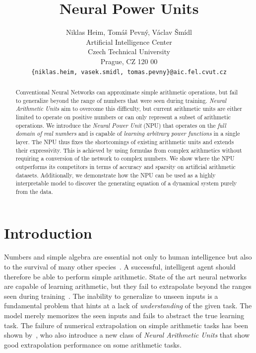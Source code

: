 \documentclass[9pt]{article}
\title{Neural Power Units}
\author{
  Niklas Heim,
  Tom\'a\v s Pevn\'y,
  V\'aclav \v Sm\'idl\\
  Artificial Intelligence Center\\
  Czech Technical University\\
  Prague, CZ 120 00\\
  \texttt{\{niklas.heim, vasek.smidl, tomas.pevny\}@aic.fel.cvut.cz}\\
}
\begin{document}
\maketitle

\begin{abstract}
  Conventional Neural Networks can approximate simple arithmetic operations, but fail
  to generalize beyond the range of numbers that were seen during training.
  \emph{Neural Arithmetic Units} aim to overcome this difficulty, but current
  arithmetic units are either limited to operate on positive numbers or can
  only represent a subset of arithmetic operations. We introduce the \emph{Neural
  Power Unit} (NPU) that operates on the
  \emph{full domain of real numbers} and is capable of \emph{learning
  arbitrary power functions} in a single layer.
  The NPU thus fixes the shortcomings of existing arithmetic units and extends
  their expressivity. This is achieved by using formulas from complex arithmetics
  without requiring a conversion of the network to complex numbers.
  We show where the NPU outperforms its
  competitors in terms of accuracy and sparsity on artificial arithmetic
  datasets. Additionally, we demonstrate how the NPU can be used as a highly
  interpretable model to discover the generating equation of a dynamical system
  purely from the data.
\end{abstract}


\section{Introduction}%
\label{sec:introduction}

Numbers and simple algebra are essential not only to human intelligence but
also to the survival of many other
species~\citep{dehaene_number_2011,gallistel_finding_2018}. A successful,
intelligent agent should therefore be able to perform simple arithmetic.  State
of the art neural networks are capable of learning arithmetic, but they
fail to extrapolate beyond the ranges seen during
training~\citep{suzgun_evaluating_2018,lake_generalization_2018}.  The
inability to generalize to unseen inputs is a fundamental problem that hints at
a lack of \emph{understanding} of the given task. The model merely memorizes
the seen inputs and fails to abstract the true learning task.  The failure of
numerical extrapolation on simple arithmetic tasks has been shown
by~\cite{trask_neural_2018}, who also introduce a new class of \emph{Neural
Arithmetic Units} that show good extrapolation performance on some arithmetic
tasks.
\end{document}
